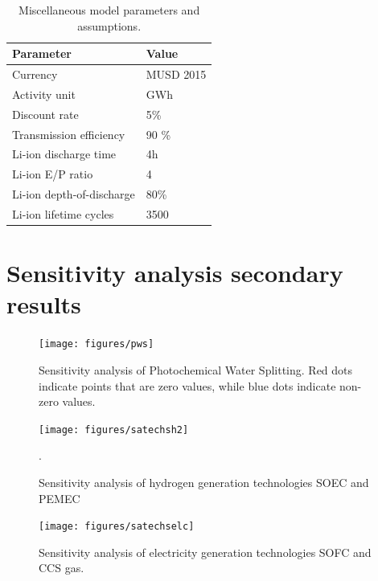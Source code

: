 \begin{table}[H]
	\caption{Miscellaneous model parameters and assumptions.}
	\vspace{0.1in}
	\begin{tabularx}{\textwidth}{p{} p{}}
		\hline
\textbf{Parameter} & \textbf{Value} \\
\hline
Currency & MUSD 2015 \\
Activity unit & GWh\\
Discount rate & 5\% \\
Transmission efficiency & 90 \% \\
Li-ion discharge time \cite{mongird_energy_2019} & 4h \\
Li-ion E/P ratio \cite{mongird_energy_2019} & 4  \\
Li-ion depth-of-discharge \cite{mongird_energy_2019} & 80\% \\
Li-ion lifetime cycles \cite{mongird_energy_2019} & 3500  \\
\hline 
	\end{tabularx}
\label{misc-assump}
\end{table}
 
\pagebreak 
 
\section{Sensitivity analysis secondary results}

\begin{figure}[H] 
\centering
\hspace*{-1cm}
\texttt{[image: figures/pws]}
\caption{Sensitivity analysis of Photochemical Water Splitting. Red dots indicate points that are zero values, while blue dots indicate non-zero values.}
\label{pws}
\end{figure}

\begin{figure}[H] 
\centering
\texttt{[image: figures/satechsh2]}
\caption{Sensitivity analysis of hydrogen generation technologies \gls{SOEC} and \gls{PEMEC}}.
\label{satechs-h2}
\end{figure}

\begin{figure}[H] 
\centering
\texttt{[image: figures/satechselc]}
\caption{Sensitivity analysis of electricity generation technologies \gls{SOFC} and \gls{CCS} gas.}
\label{satechs-elc}
\end{figure}


